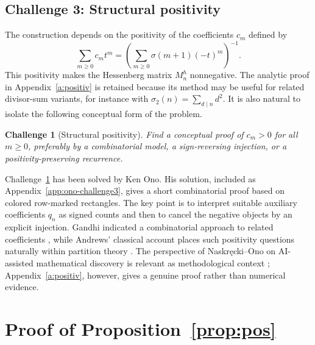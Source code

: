 \documentclass[11pt,reqno]{amsart}
\theoremstyle{plain}
\newtheorem{challenge}{Challenge}
\theoremstyle{remark}
\theoremstyle{definition}
\numberwithin{equation}{section}
\newcommand{\coefauxprod}{q}
\begin{document}
\subsection{Challenge 3: Structural positivity}

The construction depends on the positivity of the coefficients $c_m$ defined by
\[
\sum_{m\geq0}c_m t^m=
\left(\sum_{m\geq0}\sigma(m+1)(-t)^m\right)^{-1}.
\]
This positivity makes the Hessenberg matrix $M_n^h$ nonnegative. The analytic proof in Appendix~\ref{a:positiv} is retained because its method may be useful for related divisor-sum variants, for instance with $\sigma_2(n)=\sum_{d\mid n}d^2$. It is also natural to isolate the following conceptual form of the problem.

\begin{challenge}[Structural positivity]\label{cha:structural-positivity}
Find a conceptual proof of $c_m>0$ for all $m\geq0$, preferably by a combinatorial model, a sign-reversing injection, or a positivity-preserving recurrence.
\end{challenge}

Challenge~\ref{cha:structural-positivity} has been solved by Ken Ono. His solution, included as Appendix~\ref{app:ono-challenge3}, gives a short combinatorial proof based on colored row-marked rectangles. The key point is to interpret suitable auxiliary coefficients $\coefauxprod _n$ as signed counts and then to cancel the negative objects by an explicit injection. Gandhi indicated a combinatorial approach to related coefficients \cite{Ga69}, while Andrews' classical account places such positivity questions naturally within partition theory \cite{An76}. The perspective of Naskr\k{e}cki--Ono on AI-assisted mathematical discovery is relevant as methodological context \cite{NO25AI};
Appendix~\ref{a:positiv}, however, gives a genuine proof rather than numerical evidence.




\appendix
\section{\label{a:positiv}Proof of Proposition~\ref{prop:pos}}
\end{document}
